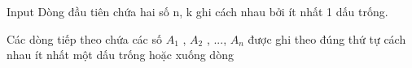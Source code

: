 Input
Dòng đầu tiên chứa hai số n, k ghi cách nhau bởi ít nhất 1 dấu trống.  

   Các dòng tiếp theo chứa các số $A_{1}$   , $A_{2}$   , ..., $A_{n}$   được ghi theo đúng thứ tự cách nhau ít nhất một dấu trống hoặc xuống dòng